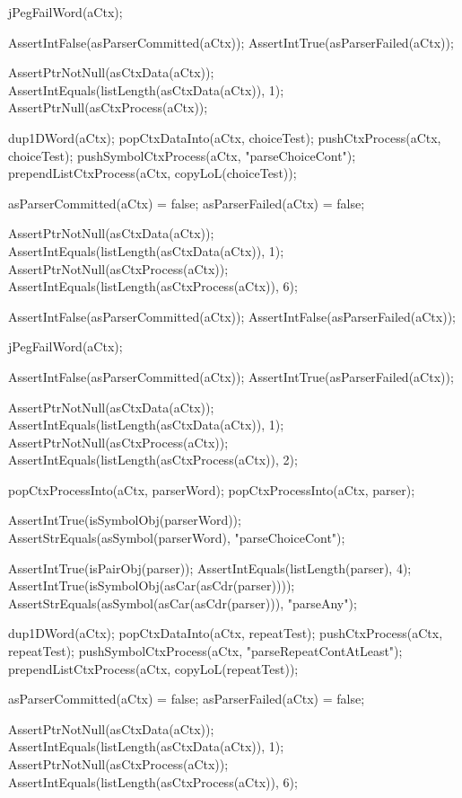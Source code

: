   jPegFailWord(aCtx);
  
  AssertIntFalse(asParserCommitted(aCtx));
  AssertIntTrue(asParserFailed(aCtx));
  
  AssertPtrNotNull(asCtxData(aCtx));
  AssertIntEquals(listLength(asCtxData(aCtx)), 1);
  AssertPtrNull(asCtxProcess(aCtx));
\stopCTest
\stopTestCase

\startCTest  
  dup1DWord(aCtx);
  popCtxDataInto(aCtx, choiceTest);
  pushCtxProcess(aCtx, choiceTest);
  pushSymbolCtxProcess(aCtx, "parseChoiceCont");
  prependListCtxProcess(aCtx, copyLoL(choiceTest));
  
  asParserCommitted(aCtx) = false;
  asParserFailed(aCtx)    = false;
  
  AssertPtrNotNull(asCtxData(aCtx));
  AssertIntEquals(listLength(asCtxData(aCtx)), 1);
  AssertPtrNotNull(asCtxProcess(aCtx));
  AssertIntEquals(listLength(asCtxProcess(aCtx)), 6);
  
  AssertIntFalse(asParserCommitted(aCtx));
  AssertIntFalse(asParserFailed(aCtx));
  
  jPegFailWord(aCtx);
  
  AssertIntFalse(asParserCommitted(aCtx));
  AssertIntTrue(asParserFailed(aCtx));
  
  AssertPtrNotNull(asCtxData(aCtx));
  AssertIntEquals(listLength(asCtxData(aCtx)), 1);
  AssertPtrNotNull(asCtxProcess(aCtx));
  AssertIntEquals(listLength(asCtxProcess(aCtx)), 2);
  
  popCtxProcessInto(aCtx, parserWord);
  popCtxProcessInto(aCtx, parser);
  
  AssertIntTrue(isSymbolObj(parserWord));
  AssertStrEquals(asSymbol(parserWord), "parseChoiceCont");
  
  AssertIntTrue(isPairObj(parser));
  AssertIntEquals(listLength(parser), 4);
  AssertIntTrue(isSymbolObj(asCar(asCdr(parser))));
  AssertStrEquals(asSymbol(asCar(asCdr(parser))), "parseAny");
\stopCTest
\stopTestCase

\startCTest
  dup1DWord(aCtx);
  popCtxDataInto(aCtx, repeatTest);
  pushCtxProcess(aCtx, repeatTest);
  pushSymbolCtxProcess(aCtx, "parseRepeatContAtLeast");
  prependListCtxProcess(aCtx, copyLoL(repeatTest));
  
  asParserCommitted(aCtx) = false;
  asParserFailed(aCtx)    = false;
  
  AssertPtrNotNull(asCtxData(aCtx));
  AssertIntEquals(listLength(asCtxData(aCtx)), 1);
  AssertPtrNotNull(asCtxProcess(aCtx));
  AssertIntEquals(listLength(asCtxProcess(aCtx)), 6);
  
